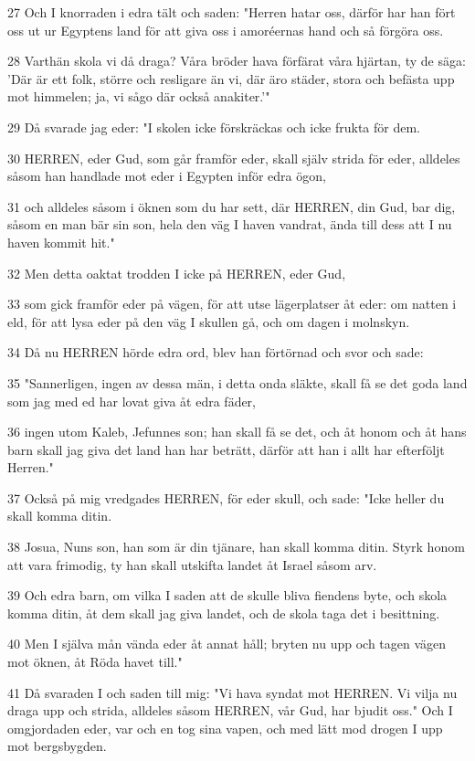 \par 27 Och I knorraden i edra tält och saden: "Herren hatar oss, därför har han fört oss ut ur Egyptens land för att giva oss i amoréernas hand och så förgöra oss.
\par 28 Varthän skola vi då draga? Våra bröder hava förfärat våra hjärtan, ty de säga: 'Där är ett folk, större och resligare än vi, där äro städer, stora och befästa upp mot himmelen; ja, vi sågo där också anakiter.'"
\par 29 Då svarade jag eder: "I skolen icke förskräckas och icke frukta för dem.
\par 30 HERREN, eder Gud, som går framför eder, skall själv strida för eder, alldeles såsom han handlade mot eder i Egypten inför edra ögon,
\par 31 och alldeles såsom i öknen som du har sett, där HERREN, din Gud, bar dig, såsom en man bär sin son, hela den väg I haven vandrat, ända till dess att I nu haven kommit hit."
\par 32 Men detta oaktat trodden I icke på HERREN, eder Gud,
\par 33 som gick framför eder på vägen, för att utse lägerplatser åt eder: om natten i eld, för att lysa eder på den väg I skullen gå, och om dagen i molnskyn.
\par 34 Då nu HERREN hörde edra ord, blev han förtörnad och svor och sade:
\par 35 "Sannerligen, ingen av dessa män, i detta onda släkte, skall få se det goda land som jag med ed har lovat giva åt edra fäder,
\par 36 ingen utom Kaleb, Jefunnes son; han skall få se det, och åt honom och åt hans barn skall jag giva det land han har beträtt, därför att han i allt har efterföljt Herren."
\par 37 Också på mig vredgades HERREN, för eder skull, och sade: "Icke heller du skall komma ditin.
\par 38 Josua, Nuns son, han som är din tjänare, han skall komma ditin. Styrk honom att vara frimodig, ty han skall utskifta landet åt Israel såsom arv.
\par 39 Och edra barn, om vilka I saden att de skulle bliva fiendens byte, och skola komma ditin, åt dem skall jag giva landet, och de skola taga det i besittning.
\par 40 Men I själva mån vända eder åt annat håll; bryten nu upp och tagen vägen mot öknen, åt Röda havet till."
\par 41 Då svaraden I och saden till mig: "Vi hava syndat mot HERREN. Vi vilja nu draga upp och strida, alldeles såsom HERREN, vår Gud, har bjudit oss." Och I omgjordaden eder, var och en tog sina vapen, och med lätt mod drogen I upp mot bergsbygden.
